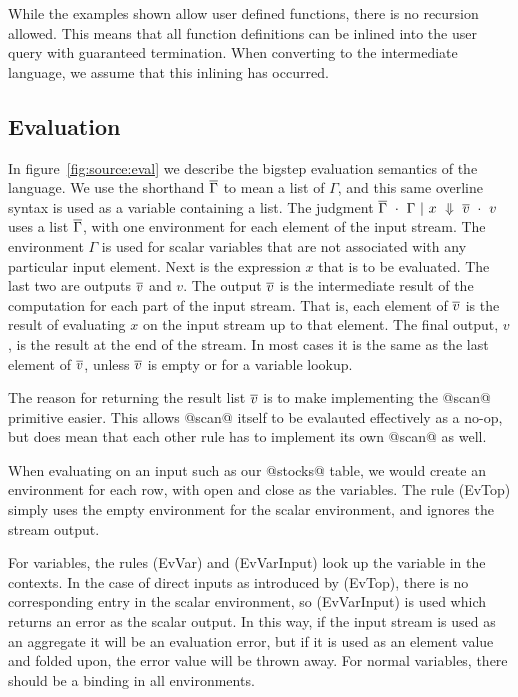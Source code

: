 While the examples shown allow user defined functions, there is no recursion allowed.
This means that all function definitions can be inlined into the user query with guaranteed termination.
When converting to the intermediate language, we assume that this inlining has occurred.

\subsection{Evaluation}



In figure~\ref{fig:source:eval} we describe the bigstep evaluation semantics of the language.
We use the shorthand $\overline{\Gamma}$ to mean a list of $\Gamma$, and this same overline syntax is used as a variable containing a list.
The judgment $\overline{\Gamma} ~\cdot~ \Gamma ~|~ x ~\Downarrow~ \overline{v} ~\cdot~ v$ uses a list $\overline{\Gamma}$, with one environment for each element of the input stream.
The environment $\Gamma$ is used for scalar variables that are not associated with any particular input element.
Next is the expression $x$ that is to be evaluated.
The last two are outputs $\overline{v}$ and $v$.
The output $\overline{v}$ is the intermediate result of the computation for each part of the input stream.
That is, each element of $\overline{v}$ is the result of evaluating $x$ on the input stream up to that element.
The final output, $v$, is the result at the end of the stream.
In most cases it is the same as the last element of $\overline{v}$, unless $\overline{v}$ is empty or for a variable lookup.

The reason for returning the result list $\overline{v}$ is to make implementing the @scan@ primitive easier.
This allows @scan@ itself to be evalauted effectively as a no-op, but does mean that each other rule has to implement its own @scan@ as well.



When evaluating on an input such as our @stocks@ table, we would create an environment for each row, with open and close as the variables.
The rule (EvTop) simply uses the empty environment for the scalar environment, and ignores the stream output.

For variables, the rules (EvVar) and (EvVarInput) look up the variable in the contexts.
In the case of direct inputs as introduced by (EvTop), there is no corresponding entry in the scalar environment, so (EvVarInput) is used which returns an error as the scalar output.
In this way, if the input stream is used as an aggregate it will be an evaluation error, but if it is used as an element value and folded upon, the error value will be thrown away.
For normal variables, there should be a binding in all environments.

